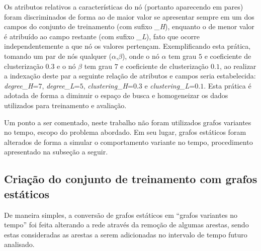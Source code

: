 \documentclass[a4paper,11pt]{article}
\begin{document}
Os atributos relativos a características do nó (portanto aparecendo em pares) foram discriminados de forma ao de maior valor se apresentar sempre em um dos campos do conjunto de treinamento (com sufixo \textit{\_H}), enquanto o de menor valor é atribuído ao campo restante (com sufixo \textit{\_L}), fato que ocorre independentemente a que nó os valores pertençam. Exemplificando esta prática, tomando um par de nós qualquer ($\alpha$,$\beta$), onde o nó $\alpha$ tem grau $5$ e coeficiente de clusterização $0.3$ e o nó $\beta$ tem grau $7$ e coeficiente de clusterização $0.1$, ao realizar a indexação  deste par a seguinte relação de atributos e campos seria estabelecida: \textit{degree\_H}=$7$, \textit{degree\_L}=$5$, \textit{clustering\_H}=0.3 e \textit{clustering\_L}=$0.1$. Esta prática é adotada de forma a diminuir o espaço de busca e homogeneizar os dados utilizados para treinamento e avaliação.



Um ponto a ser comentado, neste trabalho não foram utilizados grafos variantes no tempo, escopo do problema abordado. Em seu lugar, grafos estáticos foram alterados de forma a simular o comportamento variante no tempo, procedimento apresentado na subseção a seguir.

\vspace{0.3cm}

\subsection{Criação do conjunto de treinamento com grafos estáticos}

\vspace{0.3cm}

De maneira simples, a conversão de grafos estáticos em ``grafos variantes no tempo'' foi feita alterando a rede através da remoção de algumas arestas, sendo estas  consideradas as arestas a serem adicionadas no intervalo de tempo futuro analisado. 
\end{document}
